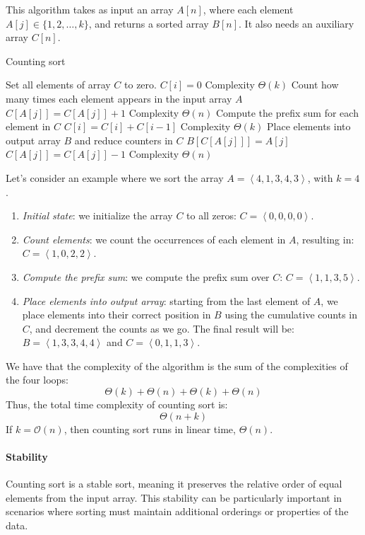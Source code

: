 This algorithm takes as input an array $A[n]$, where each element $A[j]\in\{1, 2, \dots, k\}$, and returns a sorted array $B[n]$.
It also needs an auxiliary array $C[n]$. 
\begin{algorithm}[H]
    \caption{Counting sort}
    \begin{algorithmic}[1]
         \Comment Set all elements of array $C$ to zero.
            \State $C[i]=0$ 
        \EndFor \Comment Complexity $\Theta(k)$
         \Comment Count how many times each element appears in the input array $A$
            \State $C[A[j]]=C[A[j]]+1$ 
        \EndFor \Comment Complexity $\Theta(n)$
         \Comment Compute the prefix sum for each element in $C$
            \State $C[i]=C[i]+C[i-1]$ 
        \EndFor \Comment Complexity $\Theta(k)$
         \Comment Place elements into output array $B$ and reduce counters in $C$
            \State $B[C[A[j]]]=A[j]$
            \State $C[A[j]]=C[A[j]]-1$ 
        \EndFor \Comment Complexity $\Theta(n)$
    \end{algorithmic}
\end{algorithm}  
\begin{example}
    Let's consider an example where we sort the array $A=\left\langle 4, 1, 3, 4, 3\right\rangle$, with $k=4$. 
    \begin{enumerate}
        \item \textit{Initial state}: we initialize the array $C$ to all zeros: $C=\left\langle 0,0,0,0\right\rangle$.
        \item \textit{Count elements}: we count the occurrences of each element in $A$, resulting in: $C=\left\langle 1,0,2,2\right\rangle$.
        \item \textit{Compute the prefix sum}: we compute the prefix sum over $C$: $C=\left\langle 1,1,3,5\right\rangle$.
        \item \textit{Place elements into output array}: starting from the last element of $A$, we place elements into their correct position in $B$ using the cumulative counts in $C$, and decrement the counts as we go. 
            The final result will be: $B=\left\langle 1,3,3,4,4\right\rangle$ and $C=\left\langle 0,1,1,3\right\rangle$.
    \end{enumerate}
\end{example}
We have that the complexity of the algorithm is the sum of the complexities of the four loops: 
\[\Theta(k)+\Theta(n)+\Theta(k)+\Theta(n)\]
Thus, the total time complexity of counting sort is: 
\[\Theta(n+k)\]
If $k = \mathcal{O}(n)$, then counting sort runs in linear time, $\Theta(n)$.

\paragraph*{Stability}
Counting sort is a stable sort, meaning it preserves the relative order of equal elements from the input array. 
This stability can be particularly important in scenarios where sorting must maintain additional orderings or properties of the data.